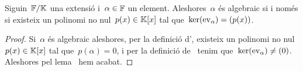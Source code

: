 \documentclass[../../main.tex]{subfiles}
\begin{document}
    \begin{observation}
        \label{obs:condició equivalent a element algebraic}
        \label{obs:condició equivalent a element transcendent}
        Siguin~\(\mathbb{F}/\mathbb{K}\) una extensió i~\(\alpha\in\mathbb{F}\) un element.
        Aleshores~\(\alpha\) és algebraic si i només si existeix un polinomi no nul~\(p(x)\in\mathbb{K}[x]\) tal que~\(\operatorname{ker}(\mathrm{ev}_{\alpha})=(p(x))\).
        \begin{proof}
            Si~\(\alpha\) és algebraic aleshores, per la definició d', existeix un polinomi no nul~\(p(x)\in\mathbb{K}[x]\) tal que~\(p(\alpha)=0\), i per la definició de~ tenim que~\(\operatorname{ker}(\mathrm{ev}_{\alpha})\neq(0)\).
            Aleshores pel lema~ hem acabat.
        \end{proof}
    \end{observation}
\end{document}
